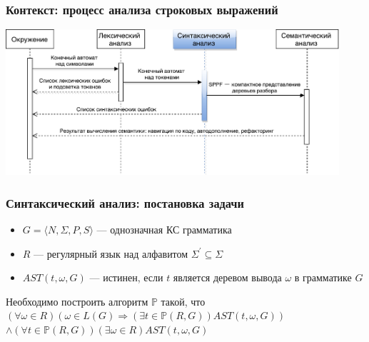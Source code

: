 \documentclass{beamer}
\begin{document}
\begin{frame}
    \transwipe[direction=90]
    \frametitle{Контекст: процесс анализа строковых выражений}
    \begin{center}
        \includegraphics[width=350pt]{pictures/Seq.pdf}
    \end{center}
\end{frame}

\begin{frame}
    \transwipe[direction=90]
    \frametitle{Синтаксический анализ: постановка задачи}
    \begin{itemize}    
        \item $G=\langle N,\Sigma, P,S\rangle$ --- однозначная КС грамматика
        \item $R$ --- регулярный язык над алфавитом ${\Sigma}^{'} \subseteq \Sigma $
        \item $AST(t,\omega,G)$ --- истинен, если $t$ является деревом вывода $\omega$ в грамматике $G$
    \end{itemize}
    \begin{block}{}
    Необходимо построить алгоритм $\mathbb{P}$ такой, что
    $(\forall \omega \in R) (\omega \in L(G) \Rightarrow (\exists t \in \mathbb{P}(R,G))AST(t, \omega, G))$
    $\land (\forall t \in \mathbb{P}(R,G))(\exists \omega \in R)AST(t,\omega,G)$
    \end{block}
\end{frame}
\end{document}
